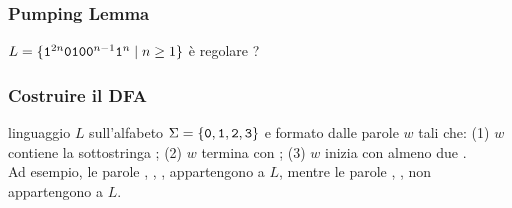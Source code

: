 \begin{frame}[fragile]
        \frametitle{Pumping Lemma}
        $L = \{ \mathtt{1}^{2n}\mathtt{0}\mathtt{1}\mathtt{0}\mathtt{0}^{n-1}\mathtt{1}^{n} \; \vert \; n \ge 1 \}$ è regolare ?
        \end{frame}

\begin{frame}[fragile]
\frametitle{Costruire il DFA}
linguaggio $L$ sull'alfabeto $\Sigma = \{\mathtt{0}, \mathtt{1}, \mathtt{2}, \mathtt{3}\}$ e formato dalle
parole $w$ tali che:
(1) $w$ contiene la sottostringa \zero\zero\uno;
(2) $w$ termina con \zero;
(3) $w$ inizia con almeno due \zero.\\
Ad esempio, le parole \zero\zero\uno\zero, \zero\zero\uno\zero\uno\zero,
\zero\zero\uno\uno\due\uno\zero,
\zero\zero\zero\tre\zero\zero\uno\due\tre\zero appartengono a $L$,
mentre
le parole \zero\zero\due\uno\due\tre\zero, \zero\zero\uno\due\uno\tre\tre, \zero\uno\due\uno\tre\uno\zero non appartengono a $L$.
\end{frame}


